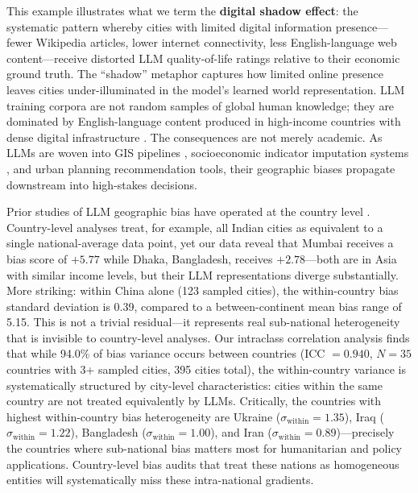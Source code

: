 \documentclass[12pt]{article}
\begin{document}
This example illustrates what we term the \textbf{digital shadow effect}: the systematic pattern whereby cities with limited digital information presence---fewer Wikipedia articles, lower internet connectivity, less English-language web content---receive distorted LLM quality-of-life ratings relative to their economic ground truth. The ``shadow'' metaphor captures how limited online presence leaves cities under-illuminated in the model's learned world representation. LLM training corpora are not random samples of global human knowledge; they are dominated by English-language content produced in high-income countries with dense digital infrastructure \citep{graham2014uneven}. The consequences are not merely academic. As LLMs are woven into GIS pipelines \citep{li2025giscience}, socioeconomic indicator imputation systems \citep{mai2024geollm}, and urban planning recommendation tools, their geographic biases propagate downstream into high-stakes decisions.

Prior studies of LLM geographic bias have operated at the country level \citep{manvi2024geographically,decoupes2025geographical}. Country-level analyses treat, for example, all Indian cities as equivalent to a single national-average data point, yet our data reveal that Mumbai receives a bias score of $+5.77$ while Dhaka, Bangladesh, receives $+2.78$---both are in Asia with similar income levels, but their LLM representations diverge substantially. More striking: within China alone (123 sampled cities), the within-country bias standard deviation is 0.39, compared to a between-continent mean bias range of 5.15. This is not a trivial residual---it represents real sub-national heterogeneity that is invisible to country-level analyses. Our intraclass correlation analysis finds that while 94.0\% of bias variance occurs between countries (ICC $= 0.940$, $N = 35$ countries with 3+ sampled cities, 395 cities total), the within-country variance is systematically structured by city-level characteristics: cities within the same country are not treated equivalently by LLMs. Critically, the countries with highest within-country bias heterogeneity are Ukraine ($\sigma_\text{within} = 1.35$), Iraq ($\sigma_\text{within} = 1.22$), Bangladesh ($\sigma_\text{within} = 1.00$), and Iran ($\sigma_\text{within} = 0.89$)---precisely the countries where sub-national bias matters most for humanitarian and policy applications. Country-level bias audits that treat these nations as homogeneous entities will systematically miss these intra-national gradients.
\end{document}

